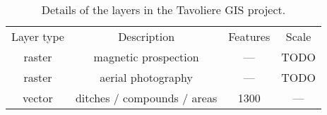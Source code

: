 \begin{table}
    \centering
    \begin{tabular}{cccc}
        \toprule
        Layer type & Description          & Features & Scale \\
        \otoprule
        raster     & magnetic prospection & ---      & TODO  \\
        raster     & aerial photography   & ---      & TODO  \\
        vector     & ditches / compounds / areas & 1300   & ---   \\
        \bottomrule
    \end{tabular}
    \caption[List of layers in Tavoliere neolithic GIS project]{Details of the layers in the Tavoliere GIS project.
    \label{tab:layers}
    }
\end{table}


